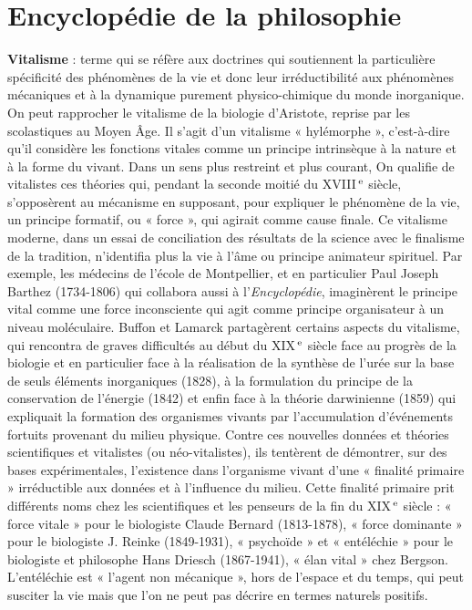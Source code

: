 
\section{Encyclopédie de la philosophie}
{\bf Vitalisme} : terme qui se réfère aux doctrines qui soutiennent la particulière spécificité des phénomènes de la vie et donc
leur  irréductibilité aux phénomènes
mécaniques et à la dynamique purement
physico-chimique du monde inorganique.
On peut rapprocher le vitalisme de la biologie d’Aristote, reprise par les scolastiques au Moyen Âge. Il s’agit d’un
vitalisme  « hylémorphe », c’est-à-dire
qu'il considère les fonctions vitales
comme un principe intrinsèque à la
nature et à la forme du vivant. Dans un
sens plus restreint et plus courant, On qualifie
%
de vitalistes ces théories qui, pendant
la seconde moitié du {\footnotesize XVIII}$^\text{\,e}$ siècle, s’opposèrent au mécanisme en supposant, pour
expliquer le phénomène de la vie, un principe formatif, ou « force », qui agirait
comme cause finale. Ce  vitalisme
moderne, dans un essai de conciliation
des résultats de la science avec le finalisme de la tradition, n’identifia plus la vie
à l'âme ou principe animateur spirituel.
Par exemple, les médecins de l'école de
Montpellier, et en particulier Paul Joseph
Barthez (1734-1806) qui collabora aussi à
l'{\it Encyclopédie}, imaginèrent le principe
vital comme une force inconsciente qui
agit comme principe organisateur à un
niveau moléculaire. Buffon et Lamarck
partagèrent certains aspects du vitalisme,
qui rencontra de graves difficultés au
début du {\footnotesize XIX}$^\text{\,e}$ siècle face au progrès de la biologie et en particulier face à la réalisation
de la synthèse de l’urée sur la base de
seuls éléments inorganiques (1828), à la
formulation du principe de la conservation de l’énergie (1842) et enfin face à la
théorie darwinienne (1859) qui expliquait
la formation des organismes vivants par
l’accumulation d'événements fortuits provenant du milieu physique. Contre ces
nouvelles données et théories scientifiques et vitalistes (ou néo-vitalistes), ils
tentèrent de démontrer, sur des bases
expérimentales, l'existence dans l’organisme vivant d’une « finalité primaire »
irréductible aux données et à l'influence
du milieu. Cette finalité primaire prit différents noms chez les scientifiques et les
penseurs de la fin du {\footnotesize XIX}$^\text{\,e}$ siècle : « force vitale » pour le biologiste Claude Bernard
(1813-1878), « force dominante » pour le
biologiste J. Reinke (1849-1931), « psychoïde » et « entéléchie » pour le biologiste et philosophe Hans Driesch (1867-1941), « élan vital » chez Bergson. L’entéléchie est « l’agent non mécanique », hors
de l’espace et du temps, qui peut susciter
la vie mais que l’on ne peut pas décrire
en termes naturels positifs.

